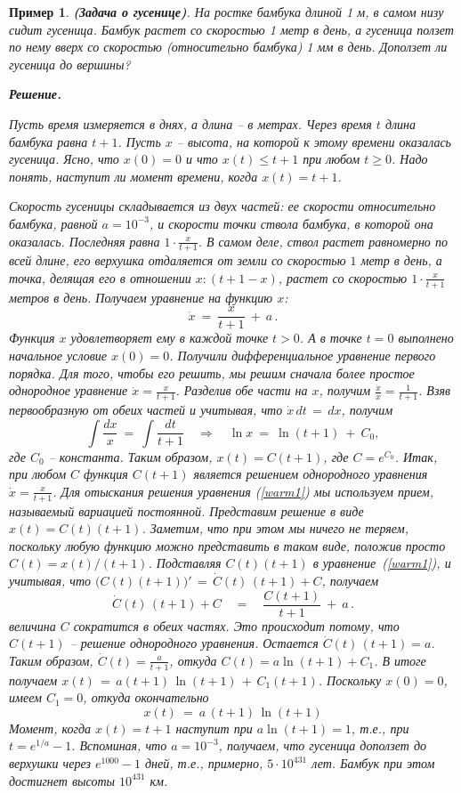 \documentclass[12pt,a4paper]{article}
\newtheorem{ex}{Пример}
\begin{document}
\begin{ex}\label{ex.warm}
\textbf{(Задача о гусенице)}. На ростке бамбука длиной 1 м, в самом низу сидит гусеница. Бамбук растет со скоростью 1 метр в день, а гусеница ползет по нему вверх со скоростью (относительно бамбука) 1 мм в день. Доползет ли гусеница до вершины?


\textbf{Решение.} {\em Пусть время измеряется в днях, а длина -- в метрах. Через время $t$ длина бамбука равна $t+1$.
Пусть $x$ -- высота, на которой к этому времени оказалась гусеница. Ясно, что $x(0) = 0$ и что $x(t) \le t+1$ при любом
$t \ge 0$. Надо понять, наступит ли момент времени, когда $x(t) = t+1$.

Скорость гусеницы складывается из двух частей: ее скорости относительно бамбука, равной $a = 10^{-3}$, и
скорости точки ствола бамбука, в которой она оказалась. Последняя равна $1\cdot \frac{x}{t+1}$. В самом деле,
 ствол растет равномерно по всей длине, его верхушка отдаляется от земли со скоростью $1$ метр в день,
 а точка, делящая его в отношении
$x: (t+1-x)$, растет со скоростью $1\cdot \frac{x}{t+1}$ метров в день. Получаем уравнение на функцию $x$:
\begin{equation}\label{warm1}
\dot x \ = \ \frac{x}{t+1}\ + \ a \, .
\end{equation}
Функция $x$ удовлетворяет ему в каждой точке $t > 0$. А в точке $t=0$ выполнено {\em начальное условие} $x(0) = 0$.
Получили дифференциальное уравнение первого порядка. Для того, чтобы его решить, мы решим сначала
более простое {\em однородное уравнение}  $\dot x  =  \frac{x}{t+1}$. Разделив обе части на $x$, получим
$\frac{\dot x}{x}  =  \frac{1}{t+1}$. Взяв первообразную от обеих частей и учитывая, что $\dot x \, d t \, = \, d x$, получим
$$
\int \frac{d x}{x} \ = \ \int \frac{d t}{t+1} \quad \Rightarrow \quad \ln x \ = \ \ln (t+1) \ + \ C_0,
$$
где $C_0$ -- константа. Таким образом, $x(t) = C(t+1)$, где $C = e^{C_0}$.  Итак, при любом $C$ функция
$C(t+1)$ является решением однородного уравнения $\dot x  =  \frac{x}{t+1}$. Для отыскания решения уравнения
(\ref{warm1}) мы используем  прием, называемый {\em вариацией постоянной}. Представим решение в виде
$x(t) = C(t) (t+1)$. Заметим, что при этом мы ничего не теряем, поскольку любую функцию можно представить в таком виде,
положив просто $C(t) = x(t)/(t+1)$. Подставляя $C(t)(t+1)$ в уравнение~(\ref{warm1}), и учитывая, что
$\bigl(C(t)(t+1) \Bigr)' \, = \, \dot C(t)\, (t+1) + C$, получаем
$$
\dot C(t)\, (t+1) + C  \quad = \quad \frac{C(t+1)}{t+1} \ + \ a\, .
$$
величина $C$ сократится  в обеих частях. Это происходит потому, что $C(t+1)$ -- решение однородного уравнения.
Остается  $\dot C(t)\, (t+1) = a$. Таким образом, $\dot C(t) = \frac{a}{t+1}$, откуда
$C(t) = a\ln (t+1) + C_1$. В итоге получаем $x(t) \, = \, a (t+1)\, \ln (t+1) \, + \, C_1(t+1)$.
Поскольку $x(0) = 0$, имеем $C_1 = 0$, откуда окончательно
$$
x(t) \ = \ a\, (t+1)\, \ln (t+1)
$$
 Момент, когда $x(t) = t+1$ наступит при $a\ln (t+1) = 1$, т.е., при $t = e^{1/a} -1$. Вспоминая, что $a=10^{-3}$,
 получаем, что гусеница доползет до верхушки через $e^{1000}-1$ дней, т.е., примерно, $5\cdot 10^{431}$ лет. Бамбук при этом достигнет высоты $10^{431}$ км.
}
\end{ex}
\end{document}

